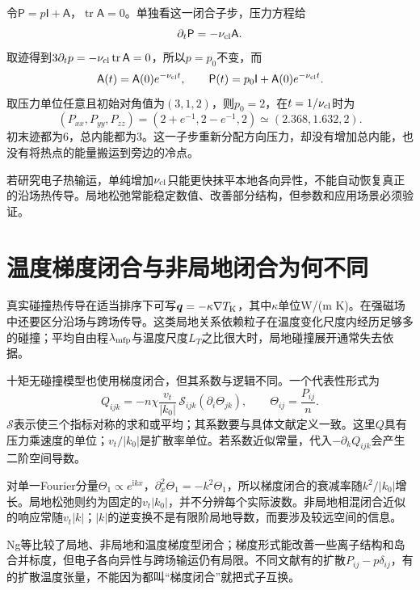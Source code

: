 令$\mathsf P=p\mathsf I+\mathsf A$，$\operatorname{tr}\mathsf A=0$。单独看这一闭合子步，压力方程给
\begin{equation}
\partial_t\mathsf P=-\nu_{\rm cl}\mathsf A.
\end{equation}
取迹得到$3\partial_tp=-\nu_{\rm cl}\operatorname{tr}\mathsf A=0$，所以$p=p_0$不变，而
\begin{equation}
\mathsf A(t)=\mathsf A(0)e^{-\nu_{\rm cl}t},\qquad
\mathsf P(t)=p_0\mathsf I+\mathsf A(0)e^{-\nu_{\rm cl}t}.
\end{equation}
取压力单位任意且初始对角值为$(3,1,2)$，则$p_0=2$，在$t=1/\nu_{\rm cl}$时为
\begin{equation}
(P_{xx},P_{yy},P_{zz})=(2+e^{-1},2-e^{-1},2)
\simeq(2.368,1.632,2).
\end{equation}
初末迹都为6，总内能都为3。这一子步重新分配方向压力，却没有增加总内能，也没有将热点的能量搬运到旁边的冷点。

若研究电子热输运，单纯增加$\nu_{\rm cl}$只能更快抹平本地各向异性，不能自动恢复真正的沿场热传导。局地松弛常能稳定数值、改善部分结构，但参数和应用场景必须验证。

\section{温度梯度闭合与非局地闭合为何不同}
真实碰撞热传导在适当排序下可写$\bm{q}=-\kappa\nabla T_{\rm K}$，其中$\kappa$单位W/(m K)。在强磁场中还要区分沿场与跨场传导。这类局地关系依赖粒子在温度变化尺度内经历足够多的碰撞；平均自由程$\lambda_{\rm mfp}$与温度尺度$L_T$之比很大时，局地碰撞展开通常失去依据。

十矩无碰撞模型也使用梯度闭合，但其系数与逻辑不同。一个代表性形式为
\begin{equation}
Q_{ijk}=-n\chi\frac{v_t}{|k_0|}\,\mathcal S_{ijk}(\partial_i\Theta_{jk}),
\qquad\Theta_{ij}=\frac{P_{ij}}n.
\end{equation}
$\mathcal S$表示使三个指标对称的求和或平均；其系数要与具体文献定义一致。这里$Q$具有压力乘速度的单位；$v_t/|k_0|$是扩散率单位。若系数近似常量，代入$-\partial_kQ_{ijk}$会产生二阶空间导数。

对单一Fourier分量$\Theta_1\propto e^{\mathrm ikx}$，$\partial_x^2\Theta_1=-k^2\Theta_1$，所以梯度闭合的衰减率随$k^2/|k_0|$增长。局地松弛则约为固定的$v_t|k_0|$，并不分辨每个实际波数。非局地相混闭合近似的响应常随$v_t|k|$；$|k|$的逆变换不是有限阶局地导数，而要涉及较远空间的信息。

Ng等比较了局地、非局地和温度梯度型闭合；梯度形式能改善一些离子结构和岛合并标度，但电子各向异性与跨场输运仍有局限。不同文献有的扩散$P_{ij}-p\delta_{ij}$，有的扩散温度张量，不能因为都叫“梯度闭合”就把式子互换。\citep{Ng2017,Ng2020,L256}

